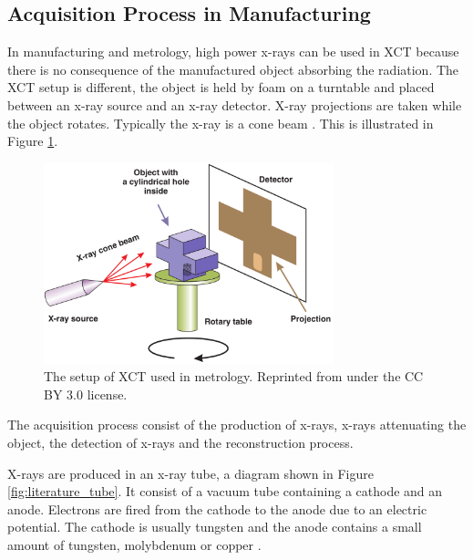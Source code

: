 \subsection{Acquisition Process in Manufacturing}

In manufacturing and metrology, high power x-rays can be used in XCT because there is no consequence of the manufactured object absorbing the radiation. The XCT setup is different, the object is held by foam on a turntable and placed between an x-ray source and an x-ray detector. X-ray projections are taken while the object rotates. Typically the x-ray is a cone beam \citep{kruth2011computed}. This is illustrated in Figure \ref{fig:literature_xct}.

\begin{figure}
  \centering
  \includegraphics[width=0.75\textwidth]{../figures/literatureReview/literature_xct.png}
  \caption{The setup of XCT used in metrology. Reprinted from \cite{warnett2016towards} under the CC BY 3.0 license.}
  \label{fig:literature_xct}
\end{figure}

The acquisition process consist of the production of x-rays, x-rays attenuating the object, the detection of x-rays and the reconstruction process.

X-rays \citep{rontgen1896on} are produced in an x-ray tube, a diagram shown in Figure \ref{fig:literature_tube}. It consist of a vacuum tube containing a cathode and an anode. Electrons are fired from the cathode to the anode due to an electric potential. The cathode is usually tungsten and the anode contains a small amount of tungsten, molybdenum or copper \citep{sun2012overview}.

